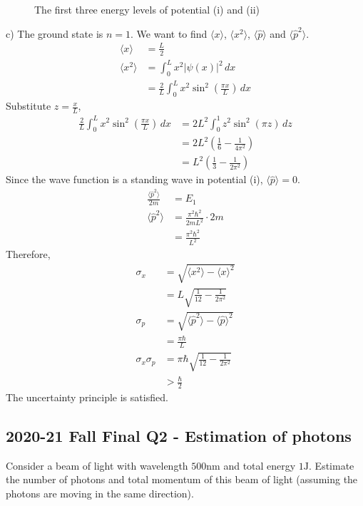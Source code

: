 \documentclass[12pt]{book} %
\numberwithin{equation}{chapter}
\def\s{\sigma}
\begin{document}
\begin{solbox}
\begin{figure}[H]
\caption{The first three energy levels of potential (i) and (ii)}
\end{figure}
\noindent
c) The ground state is $n=1$. We want to find $\langle x\rangle$, $\langle x^{2}\rangle$, $\langle \hat{p}\rangle$ and $\langle \hat{p}^{2}\rangle$.
\begin{align*}
\langle x\rangle&=\frac{L}{2}\\
\langle x^{2}\rangle&=\int_{0}^{L}x^{2}{\left|\psi(x)\right|}^{2}\,dx\\
&=\frac{2}{L}\int_{0}^{L}x^{2}\sin^{2}\left(\frac{\pi x}{L}\right)\,dx
\end{align*}
Substitute $z=\frac{x}{L}$,
\begin{align*}
\frac{2}{L}\int_{0}^{L}x^{2}\sin^{2}\left(\frac{\pi x}{L}\right)\,dx&=2L^{2}\int_{0}^{1}z^{2}\sin^{2}\left(\pi z\right)\,dz\\
&=2L^{2}\left(\frac{1}{6}-\frac{1}{4\pi^{2}}\right)\\
&=L^{2}\left(\frac{1}{3}-\frac{1}{2\pi^{2}}\right)
\end{align*}
Since the wave function is a standing wave in potential (i), $\langle \hat{p}\rangle=0$.
\begin{align*}
\frac{\langle \hat{p}^{2}\rangle}{2m}&=E_{1}\\
\langle \hat{p}^{2}\rangle&=\frac{\pi^{2}\hbar^{2}}{2mL^{2}}\cdot2m\\
&=\frac{\pi^{2}\hbar^{2}}{L^{2}}
\end{align*}
Therefore,
\begin{align*}
\s_{x}&=\sqrt{\langle x^{2}\rangle-{\langle x\rangle}^{2}}\\
&=L\sqrt{\frac{1}{12}-\frac{1}{2\pi^{2}}}\\
\s_{p}&=\sqrt{\langle \hat{p}^{2}\rangle-{\langle \hat{p}\rangle}^{2}}\\
&=\frac{\pi\hbar}{L}\\
\s_{x}\s_{p}&=\pi\hbar\sqrt{\frac{1}{12}-\frac{1}{2\pi^{2}}}\\
&>\frac{\hbar}{2}
\end{align*}
The uncertainty principle is satisfied.
\end{solbox}

\subsection*{2020-21 Fall Final Q2 - Estimation of photons}
Consider a beam of light with wavelength $500\text{nm}$ and total energy $1\text{J}$. Estimate the number of photons and total momentum of this beam of light (assuming the photons are moving in the same direction).
\end{document}
